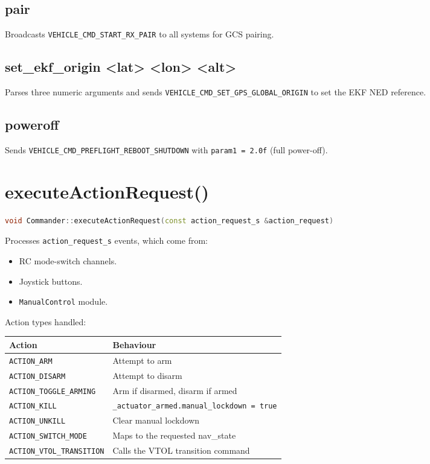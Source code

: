 \documentclass[12pt,a4paper]{article}
\begin{document}
\subsection{pair}
Broadcasts \texttt{VEHICLE\_CMD\_START\_RX\_PAIR} to all systems for GCS pairing.

\subsection{set\_ekf\_origin <lat> <lon> <alt>}
Parses three numeric arguments and sends
\texttt{VEHICLE\_CMD\_SET\_GPS\_GLOBAL\_ORIGIN} to set the EKF NED reference.

\subsection{poweroff}
Sends \texttt{VEHICLE\_CMD\_PREFLIGHT\_REBOOT\_SHUTDOWN} with
\texttt{param1 = 2.0f} (full power-off).

\section{executeActionRequest()}

\begin{lstlisting}[language=C++]
void Commander::executeActionRequest(const action_request_s &action_request)
\end{lstlisting}

Processes \texttt{action\_request\_s} events, which come from:
\begin{itemize}
  \item RC mode-switch channels.
  \item Joystick buttons.
  \item \texttt{ManualControl} module.
\end{itemize}

Action types handled:
\begin{center}\begin{tabular}{ll}\toprule
Action & Behaviour \\\midrule
\texttt{ACTION\_ARM} & Attempt to arm \\
\texttt{ACTION\_DISARM} & Attempt to disarm \\
\texttt{ACTION\_TOGGLE\_ARMING} & Arm if disarmed, disarm if armed \\
\texttt{ACTION\_KILL} & \texttt{\_actuator\_armed.manual\_lockdown = true} \\
\texttt{ACTION\_UNKILL} & Clear manual lockdown \\
\texttt{ACTION\_SWITCH\_MODE} & Maps to the requested nav\_state \\
\texttt{ACTION\_VTOL\_TRANSITION} & Calls the VTOL transition command \\
\bottomrule\end{tabular}\end{center}
\end{document}

